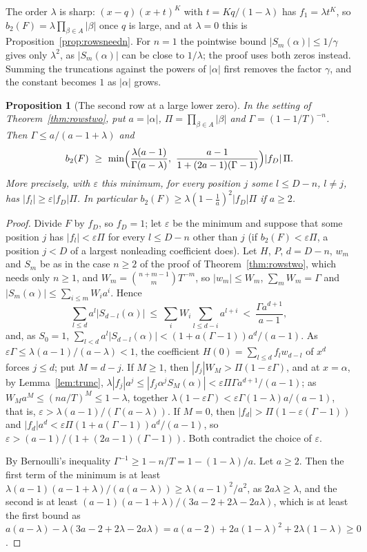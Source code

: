 \documentclass[11pt]{article}
\newtheorem{proposition}[theorem]{Proposition}
\begin{document}
The order $\lambda$ is sharp: $(x-q)(x+t)^K$ with $t=Kq/(1-\lambda)$ has
$f_1=\lambda t^K$, so $b_2(F)=\lambda\prod_{\beta\in A}|\beta|$ once $q$ is
large, and at $\lambda=0$ this is Proposition~\ref{prop:rowsneedn}.  For
$n=1$ the pointwise bound $|S_m(\alpha)|\le1/\gamma$ gives only $\lambda^2$,
as $|S_m(\alpha)|$ can be close to $1/\lambda$; the proof uses both zeros
instead.  Summing the truncations against the powers of $|\alpha|$ first
removes the factor $\gamma$, and the constant becomes $1$ as $|\alpha|$
grows.

\begin{proposition}[The second row at a large lower zero]\label{prop:rowstwolarge}
In the setting of Theorem~\ref{thm:rowstwo}, put $a=|\alpha|$,
$\Pi=\prod_{\beta\in A}|\beta|$ and $\Gamma=(1-1/T)^{-n}$.  Then
$\Gamma\le a/(a-1+\lambda)$ and
\[
  b_2(F)\ \ge\ \min\Bigl(\frac{\lambda(a-1)}{\Gamma(a-\lambda)},\
  \frac{a-1}{1+(2a-1)(\Gamma-1)}\Bigr)|f_D|\,\Pi .
\]
More precisely, with $\varepsilon$ this minimum, for every position $j$
some $l\le D-n$, $l\ne j$, has $|f_l|\ge\varepsilon|f_D|\Pi$.
In particular $b_2(F)\ge\lambda(1-\frac1a)^2|f_D|\Pi$ if $a\ge2$.
\end{proposition}

\begin{proof}
Divide $F$ by $f_D$, so $f_D=1$; let $\varepsilon$ be the minimum and
suppose that some position $j$ has $|f_l|<\varepsilon\Pi$ for every
$l\le D-n$ other than $j$ (if $b_2(F)<\varepsilon\Pi$, a position $j<D$ of a
largest nonleading coefficient does).  Let $H$, $P$, $d=D-n$, $w_m$ and $S_m$ be as in the
case $n\ge2$ of the proof of Theorem~\ref{thm:rowstwo}, which needs only
$n\ge1$, and $W_m=\binom{n+m-1}mT^{-m}$, so $|w_m|\le W_m$,
$\sum_mW_m=\Gamma$ and $|S_m(\alpha)|\le\sum_{i\le m}W_ia^i$.  Hence
\[
  \sum_{l\le d}a^l|S_{d-l}(\alpha)|\ \le\ \sum_iW_i\sum_{l\le d-i}a^{l+i}
  \ <\ \frac{\Gamma a^{d+1}}{a-1},
\]
and, as $S_0=1$, $\sum_{l<d}a^l|S_{d-l}(\alpha)|<(1+a(\Gamma-1))a^d/(a-1)$.
As $\varepsilon\Gamma\le\lambda(a-1)/(a-\lambda)<1$, the coefficient
$H(0)=\sum_{l\le d}f_lw_{d-l}$ of $x^d$ forces $j\le d$; put $M=d-j$.  If
$M\ge1$, then $|f_j|W_M>\Pi(1-\varepsilon\Gamma)$, and at $x=\alpha$, by
Lemma~\ref{lem:trunc}, $\lambda|f_j|a^j\le|f_j\alpha^jS_M(\alpha)|<\varepsilon\Pi\Gamma
a^{d+1}/(a-1)$; as $W_Ma^M\le(na/T)^M\le1-\lambda$, together
$\lambda(1-\varepsilon\Gamma)<\varepsilon\Gamma(1-\lambda)a/(a-1)$, that is,
$\varepsilon>\lambda(a-1)/(\Gamma(a-\lambda))$.  If $M=0$, then
$|f_d|>\Pi(1-\varepsilon(\Gamma-1))$ and $|f_d|a^d<\varepsilon\Pi(1+a(\Gamma-1))a^d/(a-1)$,
so $\varepsilon>(a-1)/(1+(2a-1)(\Gamma-1))$.  Both contradict the choice of
$\varepsilon$.

By Bernoulli's inequality $\Gamma^{-1}\ge1-n/T=1-(1-\lambda)/a$.  Let
$a\ge2$.  Then the first term of the minimum is at least
$\lambda(a-1)(a-1+\lambda)/(a(a-\lambda))\ge\lambda(a-1)^2/a^2$, as
$2a\lambda\ge\lambda$, and the second is at least
$(a-1)(a-1+\lambda)/(3a-2+2\lambda-2a\lambda)$, which is at least the first
bound as
$a(a-\lambda)-\lambda(3a-2+2\lambda-2a\lambda)=a(a-2)+2a(1-\lambda)^2+2\lambda(1-\lambda)\ge0$.
\end{proof}
\end{document}
